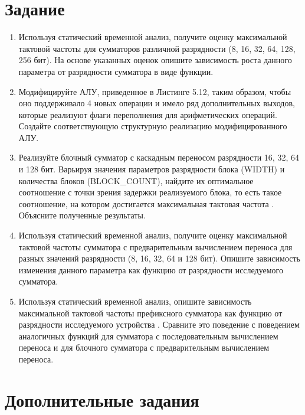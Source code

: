 \documentclass[a4paper,14pt]{article}
\begin{document}
	
	\tableofcontents
	\pagebreak
	\section{Задание}
	
	\begin{enumerate}
		\item Используя статический временной анализ, получите оценку максимальной тактовой частоты
		для сумматоров различной разрядности (8, 16, 32, 64, 128, 256 бит). На основе указанных
		оценок опишите зависимость роста данного параметра от разрядности сумматора в виде
		функции.
		
		\item Модифицируйте АЛУ, приведенное в Листинге 5.12, таким образом, чтобы оно
		поддерживало 4 новых операции и имело ряд дополнительных выходов, которые реализуют
		флаги переполнения для арифметических операций. Создайте соответствующую
		структурную реализацию модифицированного АЛУ.
		
		\item Реализуйте блочный сумматор с каскадным переносом разрядности 16, 32, 64 и 128 бит.
		Варьируя значения параметров разрядности блока (WIDTH) и количества
		блоков (BLOCK\_COUNT), найдите их оптимальное соотношение с точки зрения задержки
		реализуемого блока, то есть такое соотношение, на котором достигается максимальная
		тактовая частота . Объясните полученные результаты.
		
		\item Используя статический временной анализ, получите оценку максимальной тактовой частоты
		сумматора с предварительным вычислением переноса для разных значений разрядности (8,
		16, 32, 64 и 128 бит). Опишите зависимость изменения данного параметра как функцию от
		разрядности исследуемого сумматора.
		
		\item Используя статический временной анализ, опишите зависимость максимальной тактовой
		частоты префиксного сумматора как функцию от разрядности исследуемого устройства .
		Сравните это поведение с поведением аналогичных функций для сумматора с
		последовательным вычислением переноса и для блочного сумматора с предварительным
		вычислением переноса.
		
	\end{enumerate}
	
	\section{Дополнительные задания}
	
\end{document}
